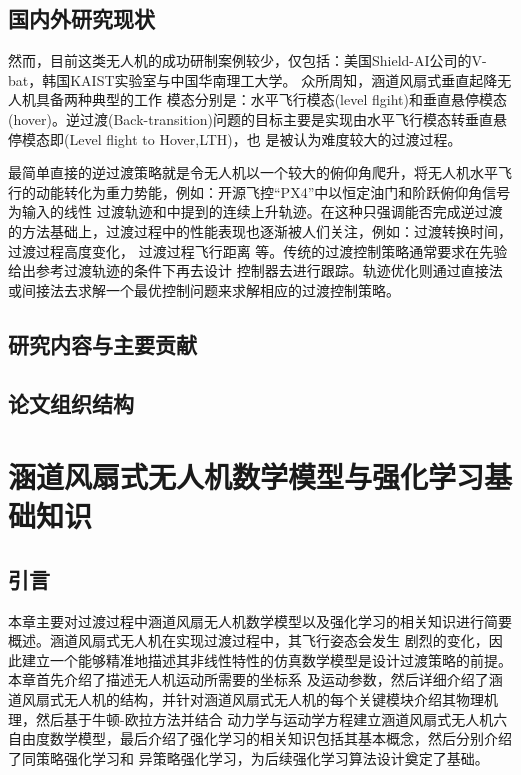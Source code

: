 \section{国内外研究现状}
然而，目前这类无人机的成功研制案例较少，仅包括：美国Shield-AI公司的V-bat，韩国KAIST实验室与中国华南理工大学。
众所周知，涵道风扇式垂直起降无人机具备两种典型的工作
模态分别是：水平飞行模态(level flgiht)和垂直悬停模态(hover)。逆过渡(Back-transition)问题的目标主要是实现由水平飞行模态转垂直悬停模态即(Level flight to Hover,LTH)，也
是被认为难度较大的过渡过程。

最简单直接的逆过渡策略就是令无人机以一个较大的俯仰角爬升\cite{green2005mav}，将无人机水平飞行的动能转化为重力势能，例如：开源飞控“PX4”中以恒定油门和阶跃俯仰角信号为输入的线性
过渡轨迹和\cite{jeong2010transition}中提到的连续上升轨迹。在这种只强调能否完成逆过渡的方法基础上，过渡过程中的性能表现也逐渐被人们关注，例如：过渡转换时间，过渡过程高度变化，
过渡过程飞行距离
等。传统的过渡控制策略通常要求在先验给出参考过渡轨迹的条件下再去设计
控制器去进行跟踪。轨迹优化则通过直接法或间接法去求解一个最优控制问题来求解相应的过渡控制策略。

\section{研究内容与主要贡献}
\section{论文组织结构}

\chapter{涵道风扇式无人机数学模型与强化学习基础知识}
\section{引言}
本章主要对过渡过程中涵道风扇无人机数学模型以及强化学习的相关知识进行简要概述。涵道风扇式无人机在实现过渡过程中，其飞行姿态会发生
剧烈的变化，因此建立一个能够精准地描述其非线性特性的仿真数学模型是设计过渡策略的前提。本章首先介绍了描述无人机运动所需要的坐标系
及运动参数，然后详细介绍了涵道风扇式无人机的结构，并针对涵道风扇式无人机的每个关键模块介绍其物理机理，然后基于牛顿-欧拉方法并结合
动力学与运动学方程建立涵道风扇式无人机六自由度数学模型，最后介绍了强化学习的相关知识包括其基本概念，然后分别介绍了同策略强化学习和
异策略强化学习，为后续强化学习算法设计奠定了基础。

